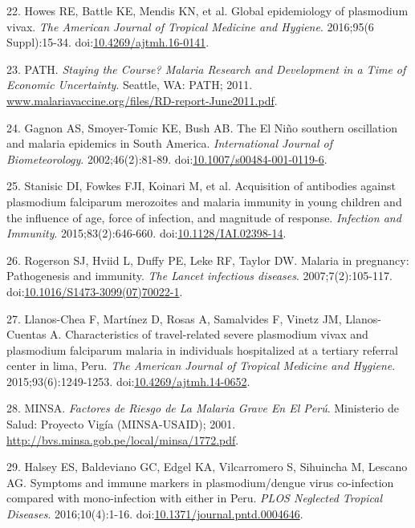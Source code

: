 \documentclass[]{article}
\begin{document}
\hypertarget{ref-howes2016global}{}
22. Howes RE, Battle KE, Mendis KN, et al. Global epidemiology of
plasmodium vivax. \emph{The American Journal of Tropical Medicine and
Hygiene}. 2016;95(6 Suppl):15-34.
doi:\href{https://doi.org/10.4269/ajtmh.16-0141}{10.4269/ajtmh.16-0141}.

\hypertarget{ref-path2011}{}
23. PATH. \emph{Staying the Course? Malaria Research and Development in
a Time of Economic Uncertainty}. Seattle, WA: PATH; 2011.
\url{www.malariavaccine.org/files/RD-report-June2011.pdf}.

\hypertarget{ref-gagnon2002enso}{}
24. Gagnon AS, Smoyer-Tomic KE, Bush AB. The El Niño southern
oscillation and malaria epidemics in South America. \emph{International
Journal of Biometeorology}. 2002;46(2):81-89.
doi:\href{https://doi.org/10.1007/s00484-001-0119-6}{10.1007/s00484-001-0119-6}.

\hypertarget{ref-Stanisic2015}{}
25. Stanisic DI, Fowkes FJI, Koinari M, et al. Acquisition of antibodies
against plasmodium falciparum merozoites and malaria immunity in young
children and the influence of age, force of infection, and magnitude of
response. \emph{Infection and Immunity}. 2015;83(2):646-660.
doi:\href{https://doi.org/10.1128/IAI.02398-14}{10.1128/IAI.02398-14}.

\hypertarget{ref-rogerson2007preg}{}
26. Rogerson SJ, Hviid L, Duffy PE, Leke RF, Taylor DW. Malaria in
pregnancy: Pathogenesis and immunity. \emph{The Lancet infectious
diseases}. 2007;7(2):105-117.
doi:\href{https://doi.org/10.1016/S1473-3099(07)70022-1}{10.1016/S1473-3099(07)70022-1}.

\hypertarget{ref-llanoschea2015}{}
27. Llanos-Chea F, Martínez D, Rosas A, Samalvides F, Vinetz JM,
Llanos-Cuentas A. Characteristics of travel-related severe plasmodium
vivax and plasmodium falciparum malaria in individuals hospitalized at a
tertiary referral center in lima, Peru. \emph{The American Journal of
Tropical Medicine and Hygiene}. 2015;93(6):1249-1253.
doi:\href{https://doi.org/10.4269/ajtmh.14-0652}{10.4269/ajtmh.14-0652}.

\hypertarget{ref-factores2001}{}
28. MINSA. \emph{Factores de Riesgo de La Malaria Grave En El Perú}.
Ministerio de Salud: Proyecto Vigía (MINSA-USAID); 2001.
\url{http://bvs.minsa.gob.pe/local/minsa/1772.pdf}.

\hypertarget{ref-baldevi2016}{}
29. Halsey ES, Baldeviano GC, Edgel KA, Vilcarromero S, Sihuincha M,
Lescano AG. Symptoms and immune markers in plasmodium/dengue virus
co-infection compared with mono-infection with either in Peru.
\emph{PLOS Neglected Tropical Diseases}. 2016;10(4):1-16.
doi:\href{https://doi.org/10.1371/journal.pntd.0004646}{10.1371/journal.pntd.0004646}.
\end{document}
